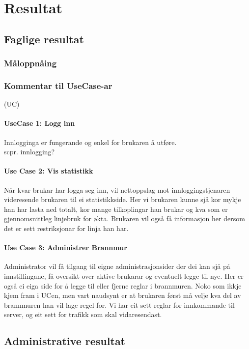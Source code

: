 \documentclass[nynorsk,12pt,a4paper,oneside]{book}
\begin{document}
\chapter{Resultat}

\section{Faglige resultat}
\subsection{Måloppnåing}
	
\subsection{Kommentar til UseCase-ar}
(UC)
\subsubsection{UseCase 1: Logg inn}
Innlogginga er fungerande og enkel for brukaren å utføre. \\
scpr. innlogging?

\subsubsection{Use Case 2: Vis statistikk}
Når kvar brukar har logga seg inn, vil nettoppslag mot innloggingstjenaren videresende brukaren til ei statistikkside. Her vi brukaren kunne sjå kor mykje han har lasta ned totalt, kor mange tilkoplingar han brukar og kva som er gjennomsnittleg linjebruk for økta. Brukaren vil også få informasjon her dersom det er sett restriksjonar for linja han har.

\subsubsection{Use Case 3: Administrer Brannmur}
Administrator vil få tilgang til eigne administrasjonsider der dei kan sjå på innstillingane, få oversikt over aktive brukarar og eventuelt legge til nye. Her er også ei eiga side for å legge til eller fjerne reglar i brannmuren. Noko som ikkje kjem fram i UCen, men vart naudsynt er at brukaren først må velje kva del av brannmuren han vil lage regel for. Vi har eit sett reglar for innkommande til server, og eit sett for trafikk som skal vidaresendast.

\section{Administrative resultat}
\end{document}
